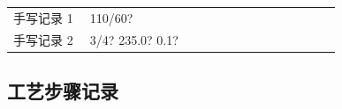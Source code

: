\documentclass[UTF8,10pt,a4paper,fontset=fandol]{ctexart}
\newcommand{\fieldvalue}[1]{#1}
\newcommand{\handwritten}[1]{#1}
\begin{document}
\vspace{0.75em}

\begin{tabular}{@{}p{0.22\linewidth}p{0.72\linewidth}@{}}
手写记录 1 &
\fieldvalue{\handwritten{110/60?}}
\\
手写记录 2 &
\fieldvalue{\handwritten{3/4? 235.0? 0.1?}}
\end{tabular}

\vspace{0.75em}

\subsection*{工艺步骤记录}
\end{document}

